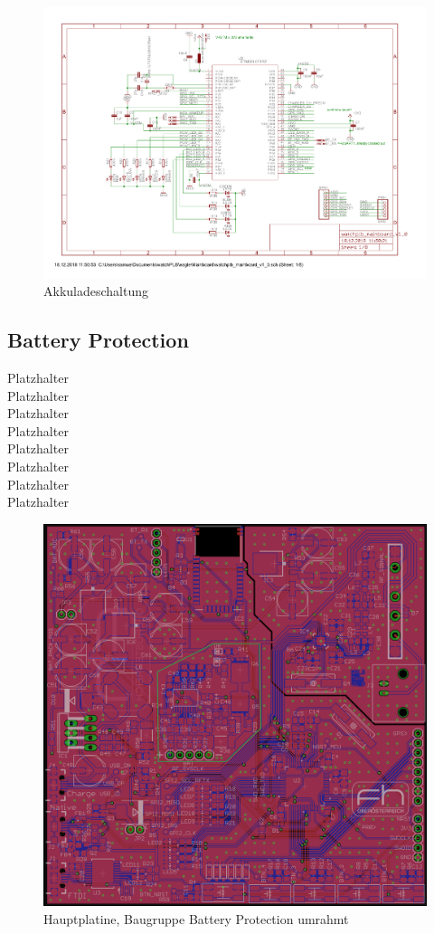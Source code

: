 \documentclass[a4paper]{scrartcl}
\begin{document}
\begin{figure}[H]\centering
\includegraphics[page=6, angle=90, width=\linewidth]{../eagle/Mainboard/watchplb_mainboard_v1_0.pdf}
\caption{Akkuladeschaltung}
\label{fig:abb1}
\end{figure}

\subsection{Battery Protection}

Platzhalter\\Platzhalter\\Platzhalter\\Platzhalter\\Platzhalter\\Platzhalter\\
Platzhalter\\Platzhalter

\begin{figure}[H]\centering
\includegraphics[page=1, angle=0, width=\linewidth]{../Documentation/pics/mainboard_batprot.png}
\caption{Hauptplatine, Baugruppe Battery Protection umrahmt}
\label{fig:abb1}
\end{figure}
\end{document}
